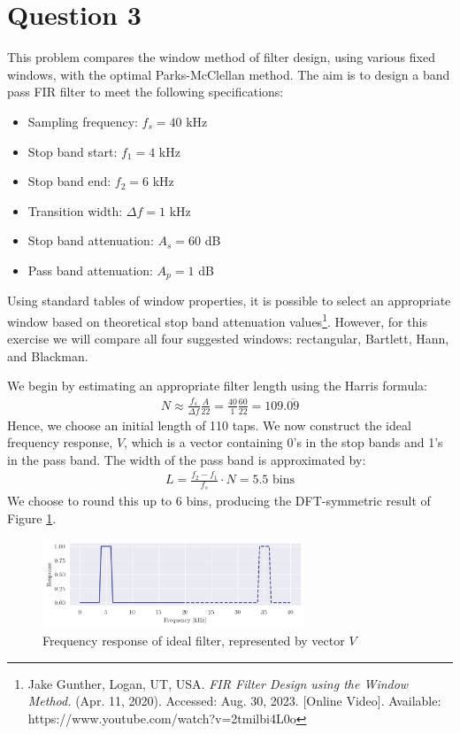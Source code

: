 \section*{Question 3}

This problem compares the window method of filter design, using various fixed windows, with the optimal Parks-McClellan method. The aim is to design a band pass FIR filter to meet the following specifications:
\begin{multicols}{2}
    \begin{itemize}
        \item Sampling frequency: $f_s=40$ kHz
        \item Stop band start: $f_1=4$ kHz
        \item Stop band end: $f_2=6$ kHz
        \item Transition width: $\Delta f=1$ kHz
        \item Stop band attenuation: $A_s=60$ dB
        \item Pass band attenuation: $A_p=1$ dB
    \end{itemize}
\end{multicols}
Using standard tables of window properties, it is possible to select an appropriate window based on theoretical stop band attenuation values\footnote{Jake Gunther, Logan, UT, USA. \textit{FIR Filter Design using the Window Method.} (Apr. 11, 2020). Accessed: Aug. 30, 2023. [Online Video]. Available: https://www.youtube.com/watch?v=2tmilbi4L0o}. However, for this exercise we will compare all four suggested windows: rectangular, Bartlett, Hann, and Blackman.

We begin by estimating an appropriate filter length using the Harris formula:
\begin{align}
    N \approx \frac{f_s}{\Delta f} \frac{A}{22} = \frac{40}{1} \frac{60}{22} = 109.\overline{09}
\end{align}
Hence, we choose an initial length of 110 taps. We now construct the ideal frequency response, $V$, which is a vector containing 0's in the stop bands and 1's in the pass band. The width of the pass band is approximated by:
\begin{align}
    L = \frac{f_2 - f_1}{f_s} \cdot N = 5.5 \text{ bins}
\end{align}
We choose to round this up to 6 bins, producing the DFT-symmetric result of Figure \ref{fig:q3_ideal_freqz}.

\begin{figure}[ht]
    \centering
    \includegraphics[width=0.7\textwidth]{images/q3_ideal_freqz.png}
    \caption{Frequency response of ideal filter, represented by vector $V$}
    \label{fig:q3_ideal_freqz}
\end{figure}


